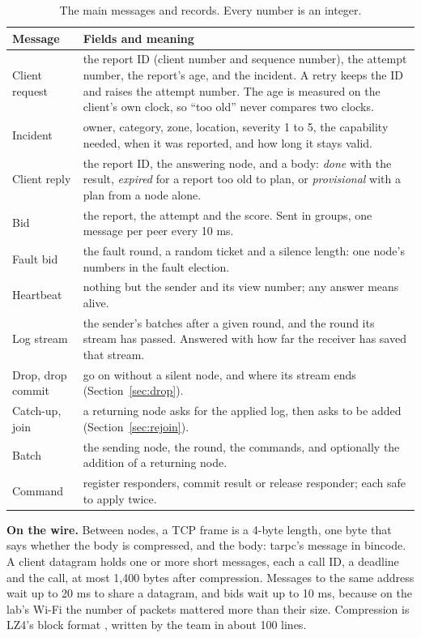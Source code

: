 \begin{table}[!htb]
\centering\small
\caption{The main messages and records. Every number is an integer.}
\label{tab:messages}
\begin{tabularx}{\linewidth}{@{}P{3.5cm}L@{}}
\toprule
Message & Fields and meaning \\
\midrule
Client request & the report ID (client number and sequence number), the attempt number, the report's age, and the incident. A retry keeps the ID and raises the attempt number. The age is measured on the client's own clock, so ``too old'' never compares two clocks. \\
Incident & owner, category, zone, location, severity 1 to 5, the capability needed, when it was reported, and how long it stays valid. \\
Client reply & the report ID, the answering node, and a body: \emph{done} with the result, \emph{expired} for a report too old to plan, or \emph{provisional} with a plan from a node alone. \\
Bid & the report, the attempt and the score. Sent in groups, one message per peer every 10 ms. \\
Fault bid & the fault round, a random ticket and a silence length: one node's numbers in the fault election. \\
Heartbeat & nothing but the sender and its view number; any answer means alive. \\
Log stream & the sender's batches after a given round, and the round its stream has passed. Answered with how far the receiver has saved that stream. \\
Drop, drop commit & go on without a silent node, and where its stream ends (Section~\ref{sec:drop}). \\
Catch-up, join & a returning node asks for the applied log, then asks to be added (Section~\ref{sec:rejoin}). \\
Batch & the sending node, the round, the commands, and optionally the addition of a returning node. \\
Command & register responders, commit result or release responder; each safe to apply twice. \\
\bottomrule
\end{tabularx}
\end{table}

\textbf{On the wire.} Between nodes, a TCP frame is a 4-byte length, one byte that says whether the body is compressed, and the body: tarpc's message in bincode. A client datagram holds one or more short messages, each a call ID, a deadline and the call, at most 1,400 bytes after compression. Messages to the same address wait up to 20 ms to share a datagram, and bids wait up to 10 ms, because on the lab's Wi-Fi the number of packets mattered more than their size. Compression is LZ4's block format \cite{lz4}, written by the team in about 100 lines.


